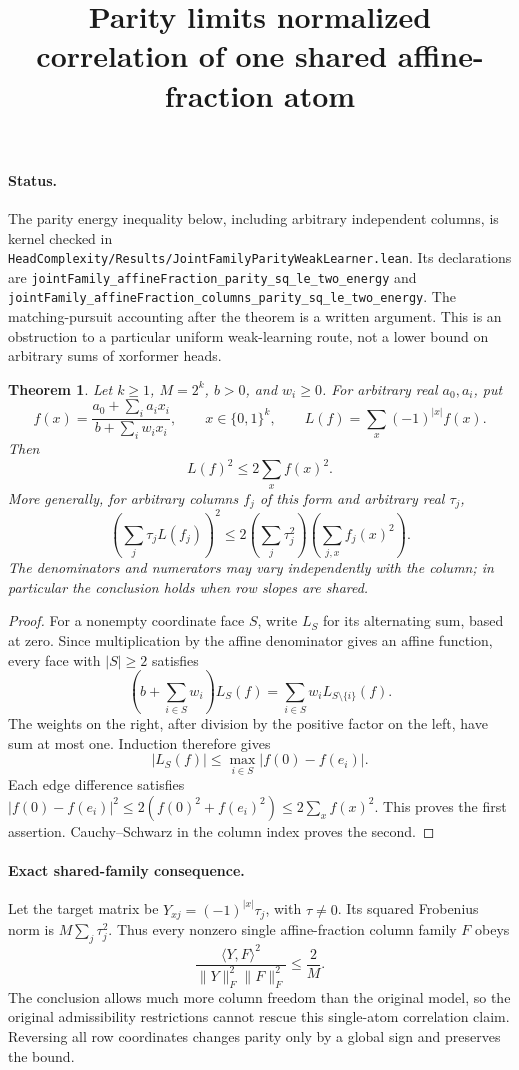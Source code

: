 \documentclass{article}
\newtheorem{theorem}{Theorem}
\begin{document}
\title{Parity limits normalized correlation of one shared affine-fraction atom}
\maketitle

\paragraph{Status.}
The parity energy inequality below, including arbitrary independent
columns, is kernel checked in
\texttt{HeadComplexity/Results/JointFamilyParityWeakLearner.lean}.
Its declarations are
\texttt{jointFamily\_affineFraction\_parity\_sq\_le\_two\_energy}
and
\texttt{jointFamily\_affineFraction\_columns\_parity\_sq\_le\_two\_energy}.
The matching-pursuit accounting after the theorem is a written argument.
This is an obstruction to a particular uniform weak-learning route,
not a lower bound on arbitrary sums of xorformer heads.

\begin{theorem}
Let $k\geq1$, $M=2^k$, $b>0$, and $w_i\geq0$. For arbitrary real
$a_0,a_i$, put
\[
 f(x)=\frac{a_0+\sum_i a_i x_i}{b+\sum_i w_i x_i},
 \qquad x\in\{0,1\}^k,
 \qquad L(f)=\sum_x(-1)^{|x|}f(x).
\]
Then
\[
 L(f)^2\leq 2\sum_x f(x)^2.
\]
More generally, for arbitrary columns $f_j$ of this form and arbitrary
real $\tau_j$,
\[
 \left(\sum_j\tau_j L(f_j)\right)^2
 \leq 2\left(\sum_j\tau_j^2\right)
              \left(\sum_{j,x}f_j(x)^2\right).
\]
The denominators and numerators may vary independently with the column;
in particular the conclusion holds when row slopes are shared.
\end{theorem}
\begin{proof}
For a nonempty coordinate face $S$, write $L_S$ for its alternating sum,
based at zero. Since multiplication by the affine denominator gives an
affine function, every face with $|S|\geq2$ satisfies
\[
 \left(b+\sum_{i\in S}w_i\right)L_S(f)
   =\sum_{i\in S}w_i L_{S\setminus\{i\}}(f).
\]
The weights on the right, after division by the positive factor on the
left, have sum at most one. Induction therefore gives
\[
 |L_S(f)|\leq\max_{i\in S}|f(0)-f(e_i)|.
\]
Each edge difference satisfies
$|f(0)-f(e_i)|^2\leq2(f(0)^2+f(e_i)^2)\leq2\sum_x f(x)^2$.
This proves the first assertion. Cauchy--Schwarz in the column index
proves the second.
\end{proof}

\paragraph{Exact shared-family consequence.}
Let the target matrix be $Y_{xj}=(-1)^{|x|}\tau_j$, with $\tau\neq0$.
Its squared Frobenius norm is $M\sum_j\tau_j^2$. Thus every nonzero
single affine-fraction column family $F$ obeys
\[
 \frac{\langle Y,F\rangle^2}{\|Y\|_F^2\|F\|_F^2}\leq\frac2M.
\]
The conclusion allows much more column freedom than the original model,
so the original admissibility restrictions cannot rescue this
single-atom correlation claim. Reversing all row coordinates changes
parity only by a global sign and preserves the bound.
\end{document}
